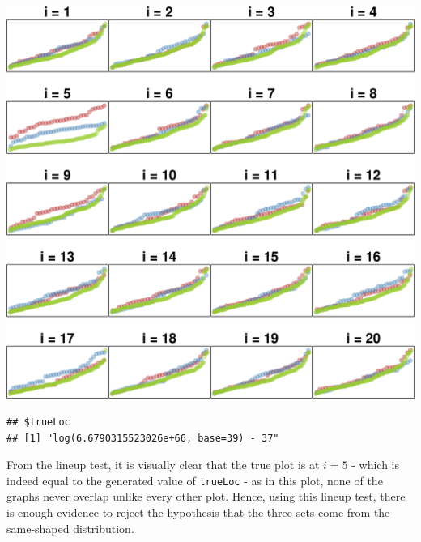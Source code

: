 \documentclass[9pt,letter]{article}
\newenvironment{Shaded}{\begin{snugshade}}{\end{snugshade}}
\newcommand{\KeywordTok}[1]{\textcolor[rgb]{0.13,0.29,0.53}{\textbf{#1}}}
\newcommand{\DataTypeTok}[1]{\textcolor[rgb]{0.13,0.29,0.53}{#1}}
\newcommand{\DecValTok}[1]{\textcolor[rgb]{0.00,0.00,0.81}{#1}}
\newcommand{\StringTok}[1]{\textcolor[rgb]{0.31,0.60,0.02}{#1}}
\newcommand{\OperatorTok}[1]{\textcolor[rgb]{0.81,0.36,0.00}{\textbf{#1}}}
\newcommand{\NormalTok}[1]{#1}
\begin{document}
\begin{Shaded}
\end{Shaded}

\begin{center}\includegraphics{a4_solutions_files/figure-latex/unnamed-chunk-8-1} \end{center}

\begin{verbatim}
## $trueLoc
## [1] "log(6.6790315523026e+66, base=39) - 37"
\end{verbatim}

From the lineup test, it is visually clear that the true plot is at
\(i = 5\) - which is indeed equal to the generated value of
\texttt{trueLoc} - as in this plot, none of the graphs never overlap
unlike every other plot. Hence, using this lineup test, there is enough
evidence to reject the hypothesis that the three sets come from the
same-shaped distribution.
\end{document}

